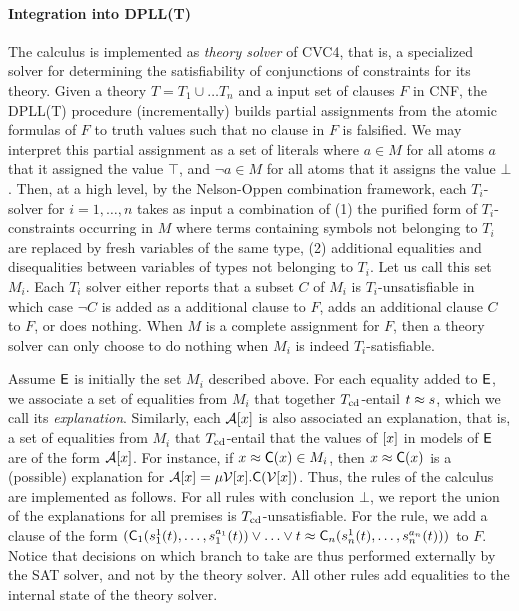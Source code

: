 \paragraph{Integration into DPLL(T)}
The calculus is implemented as \emph{theory solver} of CVC4,
that is, a specialized solver for determining the satisfiability of conjunctions of constraints for its theory.
Given a theory $T = T_1 \cup \ldots T_n$ and a input set of clauses $F$ in CNF,
the DPLL(T)  procedure
(incrementally) builds partial assignments from the atomic formulas of $F$ to truth values such that no clause in $F$ is falsified.
We may interpret this partial assignment as a set of literals where $a \in M$ for all atoms $a$ that it assigned the value $\top$, and $\neg a \in M$ for all atoms that it assigns the value $\bot$.
Then, at a high level, by the Nelson-Oppen combination framework,
each $T_i$-solver for $i = 1, \ldots, n$ takes as input a combination of (1) the purified form of $T_i$-constraints occurring in $M$ where terms containing symbols not belonging to $T_i$ are replaced by fresh variables of the same type, 
(2) additional equalities and disequalities between variables of types not belonging to $T_i$.
Let us call this set $M_i$.
Each $T_i$ solver either 
reports that a subset $C$ of $M_i$ is $T_i$-unsatisfiable in which case $\neg C$ is added as a additional clause to $F$,
adds an additional clause $C$ to $F$,
or does nothing.
When $M$ is a complete assignment for $F$, then a theory solver can only choose to do nothing when $M_i$ is indeed $T_i$-satisfiable.

Assume $\mathsf{E}$ is initially the set $M_i$ described above.
For each equality added to $\mathsf{E}$, we associate a set of equalities from $M_i$ that together $T_{\mathrm{cd}}$-entail $t \approx s$,
which we call its \emph{explanation}.
Similarly, each $\mathcal{A} [ x ]$ is also associated an explanation, that is, 
a set of equalities from $M_i$ that $T_{\mathrm{cd}}$-entail that the values of $[ x ]$ in models of $\mathsf{E}$ are of the form $\mathcal{A} [ x ]$.
For instance, if $x \approx \textsf{C}( x ) \in M_i$, then $x \approx \textsf{C}( x )$ is a (possible) explanation for $\mathcal{A} [ x ] = \mu \mathcal{V}{[ x ]}. \textsf{C}( \mathcal{V}{[ x ]} )$.
Thus, the rules of the calculus are implemented as follows.
For all rules with conclusion $\bot$,
we report the union of the explanations for all premises is $T_{\mathrm{cd}}$-unsatisfiable.
For the  rule, we add a clause of the form
$(\textsf{C}_1( s^1_1( t ), \ldots, s^{a_1}_1( t ) ) \vee \ldots \vee t \approx \textsf{C}_n( s^1_n( t ), \ldots, s^{a_n}_n( t ) ))$
to $F$.
Notice that decisions on which branch to take are thus performed externally by the SAT solver, and not by the theory solver.
All other rules add equalities to the internal state of the theory solver.

